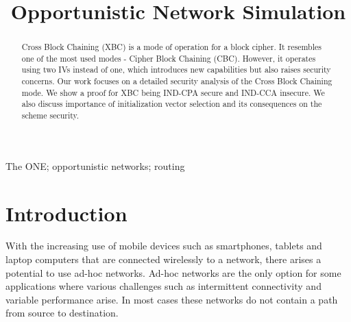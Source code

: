 \documentclass[conference]{IEEEtran}
\begin{document}
%
\title{Opportunistic Network Simulation}

\author{
}

\maketitle

\begin{abstract}
Cross Block Chaining (XBC) is a mode of operation for a block cipher. It resembles one of the most used modes - Cipher Block Chaining (CBC). However, it operates using two IVs instead of one, which introduces new capabilities but also raises security concerns. Our work focuses on a detailed security analysis of the Cross Block Chaining mode. We show a proof for XBC being IND-CPA secure and IND-CCA insecure. We also discuss importance of initialization vector selection and its consequences on the scheme security.
\end{abstract}

\begin{keywords}
The ONE; opportunistic networks; routing
\end{keywords}

\IEEEpeerreviewmaketitle

\section{Introduction}

With the increasing use of mobile devices such as smartphones, tablets and laptop computers that are connected wirelessly to a network, there arises a potential to use ad-hoc networks. Ad-hoc networks are the only option for some applications where various challenges such as intermittent connectivity and variable performance arise. In most cases these networks do not contain a path from source to destination.
\end{document}
